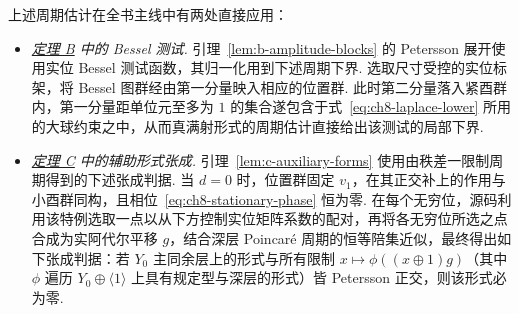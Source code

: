 上述周期估计在全书主线中有两处直接应用：
\begin{itemize}
\item {}\label{use:ch8-bessel}\emph{\hyperref[thm:enough-forms]{定理 B} 中的 Bessel 测试.} 引理~\ref{lem:b-amplitude-blocks} 的 Petersson 展开使用实位 Bessel 测试函数，其归一化用到下述周期下界. 选取尺寸受控的实位标架，将 Bessel 图群经由第一分量映入相应的位置群. 此时第二分量落入紧酉群内，第一分量距单位元至多为 $1$ 的集合遂包含于式~\eqref{eq:ch8-laplace-lower} 所用的大球约束之中，从而真满射形式的周期估计直接给出该测试的局部下界.
\item {}\label{use:ch8-restriction}\emph{\hyperref[thm:long-forms]{定理 C} 中的辅助形式张成.} 引理~\ref{lem:c-auxiliary-forms} 使用由秩差一限制周期得到的下述张成判据. 当 $d=0$ 时，位置群固定 $v_1$，在其正交补上的作用与小酉群同构，且相位~\eqref{eq:ch8-stationary-phase} 恒为零. 在每个无穷位，源码利用该特例选取一点以从下方控制实位矩阵系数的配对，再将各无穷位所选之点合成为实阿代尔平移 $g$，结合深层 Poincaré 周期的恒等陪集近似，最终得出如下张成判据：若 $Y_0$ 主同余层上的形式与所有限制 $x\mapsto\phi((x\oplus1)g)$（其中 $\phi$ 遍历 $Y_0\oplus\langle1\rangle$ 上具有规定型与深层的形式）皆 Petersson 正交，则该形式必为零.
\end{itemize}
